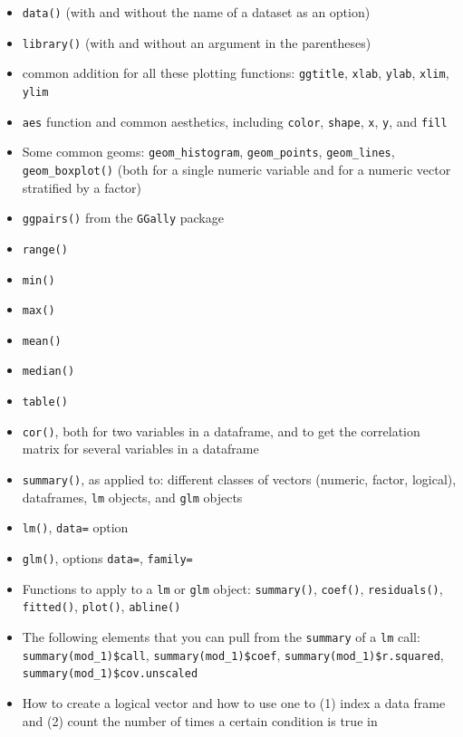 \documentclass[]{book}
\providecommand{\tightlist}{%
  \setlength{\itemsep}{0pt}\setlength{\parskip}{0pt}}
\begin{document}
\begin{itemize}
\tightlist
\item
  \texttt{data()} (with and without the name of a dataset as an option)
\item
  \texttt{library()} (with and without an argument in the parentheses)
\item
  common addition for all these plotting functions: \texttt{ggtitle},
  \texttt{xlab}, \texttt{ylab}, \texttt{xlim}, \texttt{ylim}
\item
  \texttt{aes} function and common aesthetics, including \texttt{color},
  \texttt{shape}, \texttt{x}, \texttt{y}, and \texttt{fill}
\item
  Some common geoms: \texttt{geom\_histogram}, \texttt{geom\_points},
  \texttt{geom\_lines}, \texttt{geom\_boxplot()} (both for a single
  numeric variable and for a numeric vector stratified by a factor)
\item
  \texttt{ggpairs()} from the \texttt{GGally} package
\item
  \texttt{range()}
\item
  \texttt{min()}
\item
  \texttt{max()}
\item
  \texttt{mean()}
\item
  \texttt{median()}
\item
  \texttt{table()}
\item
  \texttt{cor()}, both for two variables in a dataframe, and to get the
  correlation matrix for several variables in a dataframe
\item
  \texttt{summary()}, as applied to: different classes of vectors
  (numeric, factor, logical), dataframes, \texttt{lm} objects, and
  \texttt{glm} objects
\item
  \texttt{lm()}, \texttt{data=} option
\item
  \texttt{glm()}, options \texttt{data=}, \texttt{family=}
\item
  Functions to apply to a \texttt{lm} or \texttt{glm} object:
  \texttt{summary()}, \texttt{coef()}, \texttt{residuals()},
  \texttt{fitted()}, \texttt{plot()}, \texttt{abline()}
\item
  The following elements that you can pull from the \texttt{summary} of
  a \texttt{lm} call: \texttt{summary(mod\_1)\$call},
  \texttt{summary(mod\_1)\$coef}, \texttt{summary(mod\_1)\$r.squared},
  \texttt{summary(mod\_1)\$cov.unscaled}
\item
  How to create a logical vector and how to use one to (1) index a data
  frame and (2) count the number of times a certain condition is true in

\end{itemize}
\end{document}
